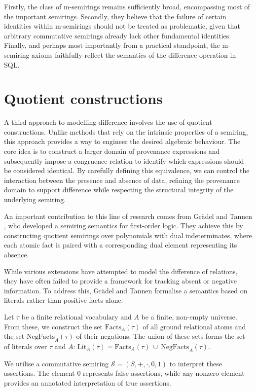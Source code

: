 \documentclass[oneside, 11pt]{amsbook}
\theoremstyle{plain}
\theoremstyle{definition}
\theoremstyle{remark}
\begin{document}
Firstly, the class of m-semirings remains sufficiently broad, encompassing most of the important semirings. Secondly, they believe that the failure of certain identities within m-semirings should not be treated as problematic, given that arbitrary commutative semirings already lack other fundamental identities. Finally, and perhaps most importantly from a practical standpoint, the m-semiring axioms faithfully reflect the semantics of the difference operation in SQL.

\section{Quotient constructions}

A third approach to modelling difference involves the use of quotient constructions. Unlike methods that rely on the intrinsic properties of a semiring, this approach provides a way to engineer the desired algebraic behaviour. The core idea is to construct a larger domain of provenance expressions and subsequently impose a congruence relation to identify which expressions should be considered identical. By carefully defining this equivalence, we can control the interaction between the presence and absence of data, refining the provenance domain to support difference while respecting the structural integrity of the underlying semiring.

An important contribution to this line of research comes from Grädel and Tannen \cite{Gradel2025}, who developed a semiring semantics for first-order logic. They achieve this by constructing quotient semirings over polynomials with dual indeterminates, where each atomic fact is paired with a corresponding dual element representing its absence.

While various extensions have attempted to model the difference of relations, they have often failed to provide a framework for tracking absent or negative information. To address this, Grädel and Tannen formalise a semantics based on literals rather than positive facts alone.

Let $\tau$ be a finite relational vocabulary and $A$ be a finite, non-empty universe. From these, we construct the set $\text{Facts}_A(\tau)$ of all ground relational atoms and the set $\text{NegFacts}_A(\tau)$ of their negations. The union of these sets forms the set of literals over $\tau$ and $A$: $\text{Lit}_{A}(\tau) = \text{Facts}_{A}(\tau) \ \cup \ \text{NegFacts}_{A}(\tau)$.

We utilise a commutative semiring $\mathcal{S} = (S, +, \cdot, 0, 1)$ to interpret these assertions. The element 0 represents false assertions, while any nonzero element provides an annotated interpretation of true assertions.
\end{document}
